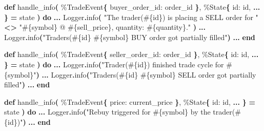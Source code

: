 \documentclass[
  oneside]{book}
\newenvironment{Shaded}{\begin{snugshade}}{\end{snugshade}}
\newcommand{\ConstantTok}[1]{\textcolor[rgb]{0.56,0.35,0.01}{#1}}
\newcommand{\FunctionTok}[1]{\textcolor[rgb]{0.13,0.29,0.53}{\textbf{#1}}}
\newcommand{\KeywordTok}[1]{\textcolor[rgb]{0.13,0.29,0.53}{\textbf{#1}}}
\newcommand{\NormalTok}[1]{#1}
\newcommand{\OperatorTok}[1]{\textcolor[rgb]{0.81,0.36,0.00}{\textbf{#1}}}
\newcommand{\OtherTok}[1]{\textcolor[rgb]{0.56,0.35,0.01}{#1}}
\newcommand{\StringTok}[1]{\textcolor[rgb]{0.31,0.60,0.02}{#1}}
\newcommand{\VariableTok}[1]{\textcolor[rgb]{0.00,0.00,0.00}{#1}}
\begin{document}
\begin{Shaded}
\begin{Highlighting}[]
  \KeywordTok{def}\NormalTok{ handle\_info}\FunctionTok{(}
\NormalTok{        \%}\ConstantTok{TradeEvent}\FunctionTok{\{}
          \VariableTok{buyer\_order\_id:}\NormalTok{ order\_id}
        \FunctionTok{\}}\NormalTok{,}
\NormalTok{        \%}\ConstantTok{State}\FunctionTok{\{}
          \VariableTok{id:}\NormalTok{ id,}
          \OperatorTok{...}
        \FunctionTok{\}} \OperatorTok{=}\NormalTok{ state}
      \FunctionTok{)} \KeywordTok{do}
    \OperatorTok{...}
        \ConstantTok{Logger}\OperatorTok{.}\NormalTok{info}\FunctionTok{(}
          \StringTok{"The trader(}\OtherTok{\#\{}\NormalTok{id}\OtherTok{\}}\StringTok{) is placing a SELL order for "} \OperatorTok{\textless{}\textgreater{}}
            \StringTok{"}\OtherTok{\#\{}\NormalTok{symbol}\OtherTok{\}}\StringTok{ @ }\OtherTok{\#\{}\NormalTok{sell\_price}\OtherTok{\}}\StringTok{, quantity: }\OtherTok{\#\{}\NormalTok{quantity}\OtherTok{\}}\StringTok{."}
        \FunctionTok{)}
        \OperatorTok{...}
        \ConstantTok{Logger}\OperatorTok{.}\NormalTok{info}\FunctionTok{(}\StringTok{"Trader\textquotesingle{}s(}\OtherTok{\#\{}\NormalTok{id}\OtherTok{\}}\StringTok{ }\OtherTok{\#\{}\NormalTok{symbol}\OtherTok{\}}\StringTok{ BUY order got partially filled"}\FunctionTok{)}
        \OperatorTok{...}
  \KeywordTok{end}

  \KeywordTok{def}\NormalTok{ handle\_info}\FunctionTok{(}
\NormalTok{        \%}\ConstantTok{TradeEvent}\FunctionTok{\{}
          \VariableTok{seller\_order\_id:}\NormalTok{ order\_id}
        \FunctionTok{\}}\NormalTok{,}
\NormalTok{        \%}\ConstantTok{State}\FunctionTok{\{}
          \VariableTok{id:}\NormalTok{ id,}
          \OperatorTok{...}
        \FunctionTok{\}} \OperatorTok{=}\NormalTok{ state}
      \FunctionTok{)} \KeywordTok{do}
    \OperatorTok{...}
      \ConstantTok{Logger}\OperatorTok{.}\NormalTok{info}\FunctionTok{(}\StringTok{"Trader(}\OtherTok{\#\{}\NormalTok{id}\OtherTok{\}}\StringTok{) finished trade cycle for }\OtherTok{\#\{}\NormalTok{symbol}\OtherTok{\}}\StringTok{"}\FunctionTok{)}
      \OperatorTok{...}
      \ConstantTok{Logger}\OperatorTok{.}\NormalTok{info}\FunctionTok{(}\StringTok{"Trader\textquotesingle{}s(}\OtherTok{\#\{}\NormalTok{id}\OtherTok{\}}\StringTok{ }\OtherTok{\#\{}\NormalTok{symbol}\OtherTok{\}}\StringTok{ SELL order got partially filled"}\FunctionTok{)}
      \OperatorTok{...}
  \KeywordTok{end}

  \KeywordTok{def}\NormalTok{ handle\_info}\FunctionTok{(}
\NormalTok{        \%}\ConstantTok{TradeEvent}\FunctionTok{\{}
          \VariableTok{price:}\NormalTok{ current\_price}
        \FunctionTok{\}}\NormalTok{,}
\NormalTok{        \%}\ConstantTok{State}\FunctionTok{\{}
          \VariableTok{id:}\NormalTok{ id,}
          \OperatorTok{...}
        \FunctionTok{\}} \OperatorTok{=}\NormalTok{ state}
      \FunctionTok{)} \KeywordTok{do}
      \OperatorTok{...}
      \ConstantTok{Logger}\OperatorTok{.}\NormalTok{info}\FunctionTok{(}\StringTok{"Rebuy triggered for }\OtherTok{\#\{}\NormalTok{symbol}\OtherTok{\}}\StringTok{ by the trader(}\OtherTok{\#\{}\NormalTok{id}\OtherTok{\}}\StringTok{)"}\FunctionTok{)}
      \OperatorTok{...}
  \KeywordTok{end}
\end{Highlighting}
\end{Shaded}
\end{document}
